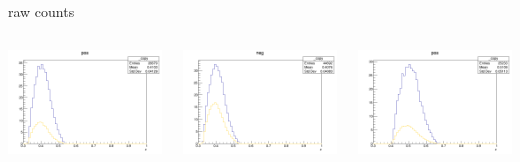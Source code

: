 \begin{frame}{raw counts}
\begin{columns}
\begin{column}[T]{0.25\textwidth}
\includegraphics[width = \textwidth]{results/yield/statistics/yield_x_Q2_z_0.45_3.898_0.40_pos.png}
\end{column}
\begin{column}[T]{0.25\textwidth}
\includegraphics[width = \textwidth]{results/yield/statistics/yield_x_Q2_z_0.45_3.898_0.40_neg.png}
\end{column}
\begin{column}[T]{0.25\textwidth}
\includegraphics[width = \textwidth]{results/yield/statistics/yield_x_Q2_z_0.45_3.898_0.50_pos.png}

\end{column}
\end{columns}
\end{frame}
